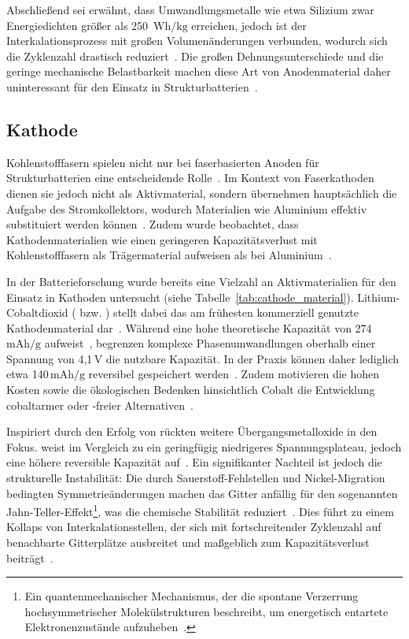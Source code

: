 

Abschließend sei erwähnt, dass Umwandlungsmetalle wie etwa Silizium zwar Energiedichten größer als 250~$\si{\watt \hour \per \kg}$ erreichen, jedoch ist der Interkalationsprozess mit großen Volumenänderungen verbunden, wodurch sich die Zyklenzahl drastisch reduziert~\cite{Gayet2009, Pereira2019}. Die großen Dehnungsunterschiede und die geringe mechanische Belastbarkeit machen diese Art von Anodenmaterial daher uninteressant für den Einsatz in Strukturbatterien~\cite{Javaid2018}.

\subsection{Kathode}

Kohlenstofffasern spielen nicht nur bei faserbasierten Anoden für Strukturbatterien eine entscheidende Rolle~\cite{Ye2024}. Im Kontext von Faserkathoden dienen sie jedoch nicht als Aktivmaterial, sondern übernehmen hauptsächlich die Aufgabe des Stromkollektors, wodurch Materialien wie Aluminium effektiv substituiert werden können~\cite{Martha2012}. Zudem wurde beobachtet, dass Kathodenmaterialien wie  einen geringeren Kapazitätsverlust mit Kohlenstofffasern als Trägermaterial aufweisen als bei Aluminium~\cite{Martha2011}.



In der Batterieforschung wurde bereits eine Vielzahl an Aktivmaterialien für den Einsatz in Kathoden untersucht (siehe Tabelle~\ref{tab:cathode_material}). Lithium-Cobaltdioxid ( bzw. ) stellt dabei das am frühesten kommerziell genutzte Kathodenmaterial dar~\cite{Amatucci1996}. Während  eine hohe theoretische Kapazität von 274\,$\si{\mA\hour\per\g}$ aufweist~\cite{Ren2023}, begrenzen komplexe Phasenumwandlungen oberhalb einer Spannung von 4,1\,V die nutzbare Kapazität. In der Praxis können daher lediglich etwa 140\,$\si{\mA\hour\per\g}$ reversibel gespeichert werden~\cite{Vetter2005, Liu2018}. Zudem motivieren die hohen Kosten sowie die ökologischen Bedenken hinsichtlich Cobalt die Entwicklung cobaltarmer oder -freier Alternativen~\cite{Ren2023}.

Inspiriert durch den Erfolg von  rückten weitere Übergangsmetalloxide in den Fokus.  weist im Vergleich zu  ein geringfügig niedrigeres Spannungsplateau, jedoch eine höhere reversible Kapazität auf~\cite{Ren2023}. Ein signifikanter Nachteil ist jedoch die strukturelle Instabilität: Die durch Sauerstoff-Fehlstellen und Nickel-Migration bedingten Symmetrieänderungen machen das Gitter anfällig für den sogenannten Jahn-Teller-Effekt\footnote{Ein quantenmechanischer Mechanismus, der die spontane Verzerrung hochsymmetrischer Molekülstrukturen beschreibt, um energetisch entartete Elektronenzustände aufzuheben~\cite{Jahn1937}.}, was die chemische Stabilität reduziert~\cite{Kalyani2005}. Dies führt zu einem Kollaps von Interkalationsstellen, der sich mit fortschreitender Zyklenzahl auf benachbarte Gitterplätze ausbreitet und maßgeblich zum Kapazitätsverlust beiträgt~\cite{Vaelikangas2020}.

